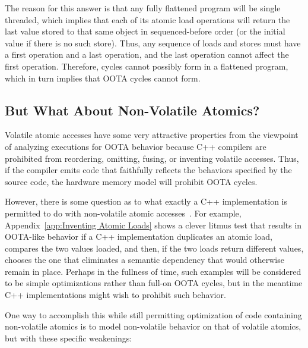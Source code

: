 \documentclass[10]{article}
\begin{document}
The reason for this answer is that any fully flattened program will be
single threaded, which implies that each of its atomic load operations
will return the last value stored to that same object in sequenced-before
order (or the initial value if there is no such store).
Thus, any sequence of loads and stores must have a first operation and
a last operation, and the last operation cannot affect the first
operation.
Therefore, cycles cannot possibly form in a flattened program,
which in turn implies that OOTA cycles cannot form.

\subsection{But What About Non-Volatile Atomics?}
\label{sec:But What About Non-Volatile Atomics?}

Volatile atomic accesses have some very attractive properties from
the viewpoint of analyzing executions for OOTA behavior because C++
compilers are prohibited from reordering, omitting, fusing, or inventing
volatile accesses.
Thus, if the compiler emits code that faithfully reflects the behaviors
specified by the source code, the hardware memory model will prohibit
OOTA cycles.

However, there is some question as to what exactly a C++ implementation
is permitted to do with non-volatile atomic accesses~\cite{JFBastien2015N4455}.
For example,
Appendix~\ref{app:Inventing Atomic Loads}
shows a clever litmus test that results in OOTA-like behavior
if a C++ implementation duplicates an atomic load, compares the two values
loaded, and then, if the two loads return different values, chooses the
one that eliminates a semantic dependency that would otherwise remain
in place.
Perhaps in the fullness of time, such examples will be considered to be
simple optimizations rather than full-on OOTA cycles, but in the meantime
C++ implementations might wish to prohibit such behavior.

One way to accomplish this while still permitting optimization of code
containing non-volatile atomics is to model non-volatile behavior on that
of volatile atomics, but with these specific weakenings:
\end{document}
